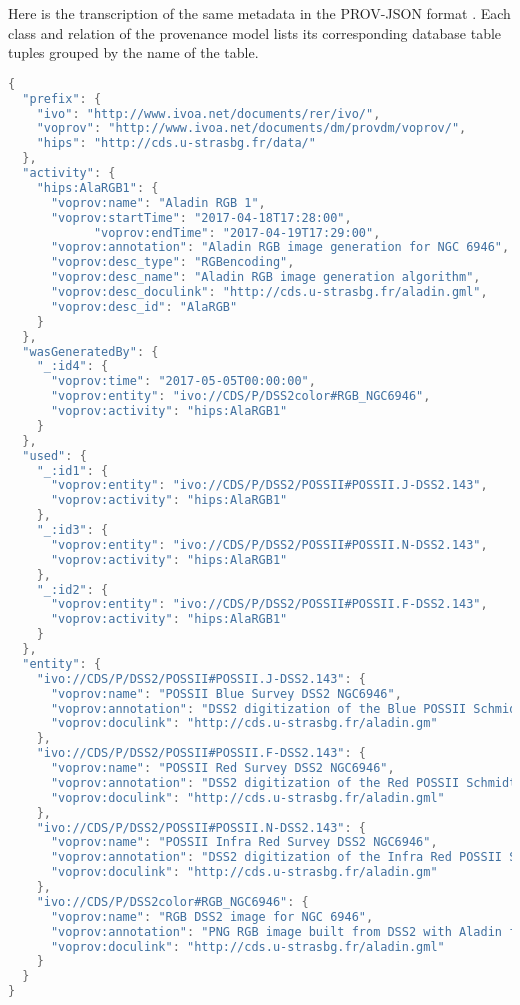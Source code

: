 Here is the transcription of the same metadata in the PROV-JSON format \citep{std:PROV-JSON}. 
Each class and relation of the provenance model lists its corresponding database table tuples grouped by the name of the table.

\begin{lstlisting}[language=C, style=customc, caption=JSON serialization example for a color composition activity]
{
  "prefix": {
    "ivo": "http://www.ivoa.net/documents/rer/ivo/",
    "voprov": "http://www.ivoa.net/documents/dm/provdm/voprov/",
    "hips": "http://cds.u-strasbg.fr/data/"
  },
  "activity": {
    "hips:AlaRGB1": {
      "voprov:name": "Aladin RGB 1",
      "voprov:startTime": "2017-04-18T17:28:00",
			"voprov:endTime": "2017-04-19T17:29:00",
      "voprov:annotation": "Aladin RGB image generation for NGC 6946",
      "voprov:desc_type": "RGBencoding",
      "voprov:desc_name": "Aladin RGB image generation algorithm",
      "voprov:desc_doculink": "http://cds.u-strasbg.fr/aladin.gml",
      "voprov:desc_id": "AlaRGB"
    }
  },
  "wasGeneratedBy": {
    "_:id4": {
      "voprov:time": "2017-05-05T00:00:00",
      "voprov:entity": "ivo://CDS/P/DSS2color#RGB_NGC6946",
      "voprov:activity": "hips:AlaRGB1"
    }
  },
  "used": {
    "_:id1": {
      "voprov:entity": "ivo://CDS/P/DSS2/POSSII#POSSII.J-DSS2.143",
      "voprov:activity": "hips:AlaRGB1"
    },
    "_:id3": {
      "voprov:entity": "ivo://CDS/P/DSS2/POSSII#POSSII.N-DSS2.143",
      "voprov:activity": "hips:AlaRGB1"
    },
    "_:id2": {
      "voprov:entity": "ivo://CDS/P/DSS2/POSSII#POSSII.F-DSS2.143",
      "voprov:activity": "hips:AlaRGB1"
    }
  },
  "entity": {
    "ivo://CDS/P/DSS2/POSSII#POSSII.J-DSS2.143": {
      "voprov:name": "POSSII Blue Survey DSS2 NGC6946",
      "voprov:annotation": "DSS2 digitization of the Blue POSSII Schmidt survey around  NGC 6946",
      "voprov:doculink": "http://cds.u-strasbg.fr/aladin.gm"
    },
    "ivo://CDS/P/DSS2/POSSII#POSSII.F-DSS2.143": {
      "voprov:name": "POSSII Red Survey DSS2 NGC6946",
      "voprov:annotation": "DSS2 digitization of the Red POSSII Schmidt survey around NGC 6946",
      "voprov:doculink": "http://cds.u-strasbg.fr/aladin.gml"
    },
    "ivo://CDS/P/DSS2/POSSII#POSSII.N-DSS2.143": {
      "voprov:name": "POSSII Infra Red Survey DSS2 NGC6946",
      "voprov:annotation": "DSS2 digitization of the Infra Red POSSII Schmidt survey around NGC 6946",
      "voprov:doculink": "http://cds.u-strasbg.fr/aladin.gm"
    },
    "ivo://CDS/P/DSS2color#RGB_NGC6946": {
      "voprov:name": "RGB DSS2 image for NGC 6946",
      "voprov:annotation": "PNG RGB image built from DSS2 with Aladin for galaxy NGC 6946",
      "voprov:doculink": "http://cds.u-strasbg.fr/aladin.gml"
    }
  }
}
\end{lstlisting}

